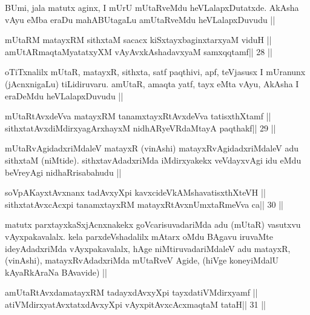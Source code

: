 \begin{artha}
BUmi, jala matutx aginx, I mUrU mUtaRveMdu heVLalapxDutatxde. AkAsha
vAyu eMba eraDu mahABUtagaLu amUtaRveMdu heVLalapxDuvudu ||
\end{artha}

\begin{shl}
mUtaRM matayxRM sithxtaM sacacx kiSxtayxbaginxtarxyaM viduH ||
amUtARmaqtaMyatatxyXM vAyAvxkAshadavxyaM samxqqtamf\hfill || 28 ||
\end{shl}

\begin{artha}
oTiTxnalilx mUtaR, matayxR, sithxta, satf paqthivi, apf, teVjasusx I
mUranunx (jAcnxnigaLu) tiLidiruvaru. amUtaR, amaqta yatf, tayx eMta
vAyu, AkAsha I eraDeMdu heVLalapxDuvudu ||
\end{artha}



\begin{shl}
mUtaRtAvxdeVva matayxRM tanamxtayxRtAvxdeVva tatisxthXtamf ||
sithxtatAvxdiMdirxyagArxhayxM nidhARyeVRdaMtayA paqthakf\hfill || 29 ||
\end{shl}

\begin{artha}
mUtaRvAgidadxriMdaleV matayxR (vinAshi) matayxRvAgidadxriMdaleV adu
sithxtaM (niMtide). sithxtavAdadxriMda iMdirxyakekx veVdayxvAgi idu
eMdu beVreyAgi nidhaRrisabahudu ||
\end{artha}



\begin{shl}
soVpAKayxtAvxnanx tadAvxyXpi kavxcideVkAMshavatisxthXteVH ||
sithxtatAvxcAcxpi tanamxtayxRM matayxRtAvxnUmxtaRmeVva ca\hfill || 30 ||
\end{shl}

\begin{artha}
matutx parxtayxkaSxjAcnxnakekx goVcarisuvadariMda adu (mUtaR) vasutxvu
vAyxpakavalalx. kela parxdeVshadalilx mAtarx oMdu BAgavu iruvaMte 
ideyAdadxriMda vAyxpakavalalx, hAge niMtiruvadariMdaleV adu matayxR,
(vinAshi), matayxRvAdadxriMda mUtaRveV Agide, (hiVge koneyiMdalU
kAyaRkAraNa BAvavide) ||
\end{artha}



\begin{shl}
amUtaRtAvxdamatayxRM tadayxdAvxyXpi tayxdatiVMdirxyamf ||
atiVMdirxyatAvxtatxdAvxyXpi vAyxpitAvxcAcxmaqtaM tataH\hfill || 31 ||
\end{shl}

